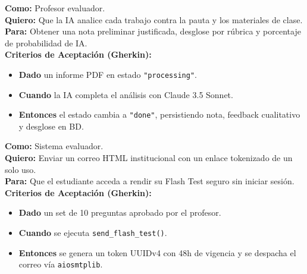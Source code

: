 \documentclass[11pt,a4paper]{article}
\begin{document}
\begin{tcolorbox}[title=US-05: Análisis Automatizado de Pauta y Detección de IA (Épica 3 — 8 SP)]
\textbf{Como:} Profesor evaluador.\\
\textbf{Quiero:} Que la IA analice cada trabajo contra la pauta y los materiales de clase.\\
\textbf{Para:} Obtener una nota preliminar justificada, desglose por rúbrica y porcentaje de probabilidad de IA.\\
\textbf{Criterios de Aceptación (Gherkin):}
\begin{itemize}
    \item \textbf{Dado} un informe PDF en estado \texttt{"processing"}.
    \item \textbf{Cuando} la IA completa el análisis con Claude 3.5 Sonnet.
    \item \textbf{Entonces} el estado cambia a \texttt{"done"}, persistiendo nota, feedback cualitativo y desglose en BD.
\end{itemize}
\end{tcolorbox}

\begin{tcolorbox}[title=US-08: Despacho Asíncrono de Flash Test por Correo (Épica 5 — 5 SP)]
\textbf{Como:} Sistema evaluador.\\
\textbf{Quiero:} Enviar un correo HTML institucional con un enlace tokenizado de un solo uso.\\
\textbf{Para:} Que el estudiante acceda a rendir su Flash Test seguro sin iniciar sesión.\\
\textbf{Criterios de Aceptación (Gherkin):}
\begin{itemize}
    \item \textbf{Dado} un set de 10 preguntas aprobado por el profesor.
    \item \textbf{Cuando} se ejecuta \texttt{send\_flash\_test()}.
    \item \textbf{Entonces} se genera un token UUIDv4 con 48h de vigencia y se despacha el correo vía \texttt{aiosmtplib}.
\end{itemize}
\end{tcolorbox}
\end{document}
